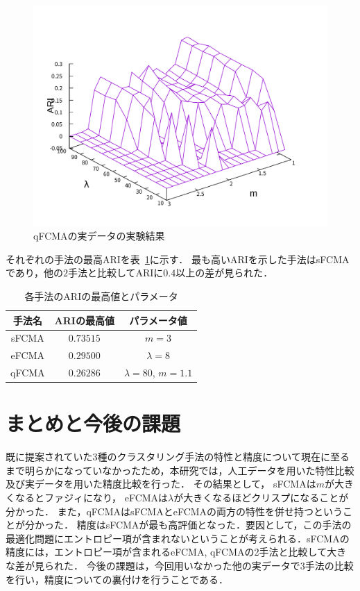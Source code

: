 \documentclass[twocolumn, a4paper]{icethesisabst}
\begin{document}
\begin{figure}[htbp]
\begin{minipage}{0.43\hsize}
  \includegraphics[width=\linewidth]{qFCMA_ARI.pdf}
  \caption{qFCMAの実データの実験結果}
  \label{fig:qFCMA_ARI}
 \end{minipage}
\end{figure}
  
それぞれの手法の最高ARIを表~\ref{tbl:max_ari}に示す．
最も高いARIを示した手法はsFCMAであり，他の$2$手法と比較してARIに$0.4$以上の差が見られた．

\vspace{0.2cm}
\begin{table}[htbp]
 \centering
 \caption{各手法のARIの最高値とパラメータ}
 \begin{center}
  \begin{tabular}{ c || c | c }\hline
   手法名 & ARIの最高値 & パラメータ値\\ \hline \hline
   sFCMA & $0.73515$ & $m = 3$\\ \hline
   eFCMA & $0.29500$& $\lambda = 8$\\ \hline  
   qFCMA & $0.26286$ & $\lambda = 80$, $m = 1.1$\\  \hline
  \end{tabular}
  \label{tbl:max_ari}
 \end{center}
\end{table}


\section{まとめと今後の課題}
既に提案されていた3種のクラスタリング手法の特性と精度について現在に至るまで明らかになっていなかったため，本研究では，人工データを用いた特性比較及び実データを用いた精度比較を行った．
その結果として，
sFCMAは$m$が大きくなるとファジィになり，
eFCMAは$\lambda$が大きくなるほどクリスプになることが分かった．
また，qFCMAはsFCMAとeFCMAの両方の特性を併せ持つということが分かった．
精度はsFCMAが最も高評価となった．要因として，この手法の最適化問題にエントロピー項が含まれないということが考えられる．sFCMAの精度には，エントロピー項が含まれるeFCMA, qFCMAの2手法と比較して大きな差が見られた．
今後の課題は，今回用いなかった他の実データで$3$手法の比較を行い，精度についての裏付けを行うことである．
\end{document}
